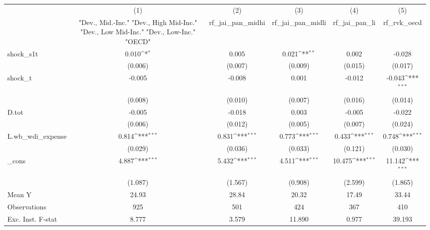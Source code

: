 {
\def\sym#1{\ifmmode^{#1}\else\(^{#1}\)\fi}
\begin{tabular}{l*{5}{c}}
\toprule
            &\multicolumn{1}{c}{(1)}&\multicolumn{1}{c}{(2)}&\multicolumn{1}{c}{(3)}&\multicolumn{1}{c}{(4)}&\multicolumn{1}{c}{(5)}\\
            &\multicolumn{1}{c}{ "Dev., Mid.-Inc." "Dev., High Mid-Inc." "Dev., Low Mid-Inc." "Dev., Low-Inc." "OECD" }&\multicolumn{1}{c}{rf\_jai\_pan\_midhi}&\multicolumn{1}{c}{rf\_jai\_pan\_midli}&\multicolumn{1}{c}{rf\_jai\_pan\_li}&\multicolumn{1}{c}{rf\_rvk\_oecd}\\
\midrule
shock\_s1t   &       0.010\sym{*}  &       0.005         &       0.021\sym{**} &       0.002         &      -0.028         \\
            &     (0.006)         &     (0.007)         &     (0.009)         &     (0.015)         &     (0.017)         \\
\addlinespace
shock\_t     &      -0.005         &      -0.008         &       0.001         &      -0.012         &      -0.043\sym{***}\\
            &     (0.008)         &     (0.010)         &     (0.007)         &     (0.016)         &     (0.014)         \\
\addlinespace
D.tot       &      -0.005         &      -0.018         &       0.003         &      -0.005         &      -0.022         \\
            &     (0.006)         &     (0.012)         &     (0.005)         &     (0.007)         &     (0.024)         \\
\addlinespace
L.wb\_wdi\_expense&       0.814\sym{***}&       0.831\sym{***}&       0.773\sym{***}&       0.433\sym{***}&       0.748\sym{***}\\
            &     (0.029)         &     (0.036)         &     (0.033)         &     (0.121)         &     (0.030)         \\
\addlinespace
\_cons      &       4.887\sym{***}&       5.432\sym{***}&       4.511\sym{***}&      10.475\sym{***}&      11.142\sym{***}\\
            &     (1.087)         &     (1.567)         &     (0.908)         &     (2.599)         &     (1.865)         \\
\midrule
Mean Y      &       24.93         &       28.84         &       20.32         &       17.49         &       33.44         \\
Observations&         925         &         501         &         424         &         367         &         410         \\
Exc. Inst. F-stat&       8.777         &       3.579         &      11.890         &       0.977         &      39.193         \\
\bottomrule
\end{tabular}
}
